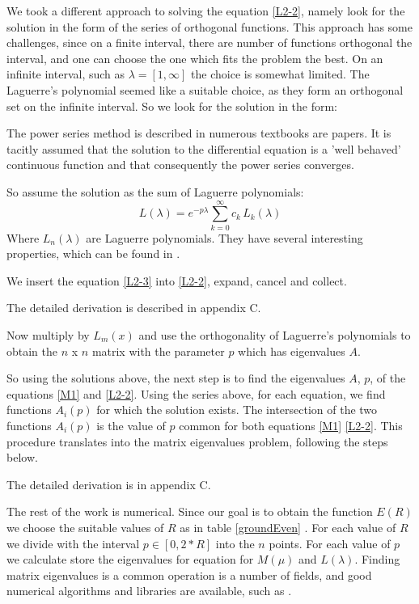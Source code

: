 We took a different approach to solving the equation \eqref{L2-2}, namely look for the solution in the form of the series of orthogonal functions. This approach has some challenges, since on a finite interval, there are number of functions orthogonal the interval, and one can choose the one which fits the problem the best. On an infinite interval, such as $ \lambda = [1, \infty] $ the choice is somewhat limited. The Laguerre's polynomial seemed like a suitable choice, as they form an orthogonal set on the infinite interval. So we look for the solution in the form:

The power series method is described in numerous textbooks are papers. It is tacitly assumed that the solution to the differential equation is a 'well behaved' continuous function and that consequently the power series converges.

So assume the solution as the sum of Laguerre polynomials:
\begin{equation}
L(\lambda) =  e^{-p\lambda}\sum_{k=0}^{\infty}{c_k\,L_k(\lambda)}\label{L2-3}
\end{equation}
Where $ L_n(\lambda) $ are Laguerre polynomials. They have several interesting properties, which can be found in \cite{Laguerre1}.

We insert the equation \ref{L2-3} into \ref{L2-2}, expand, cancel and collect.

The detailed derivation is described in appendix C.

Now multiply by $ L_m(x) $ and use the orthogonality of Laguerre's polynomials to obtain the $ n $ x $ n $ matrix with the parameter $ p $ which has eigenvalues $ A $.

So using the solutions above, the next step is to find the eigenvalues $ A $, $ p $, of the equations \eqref{M1} and \eqref{L2-2}. Using the series above, for each equation, we find functions $ A_i(p) $ for which the solution exists. The intersection of the two functions $ A_i(p) $ is the value of $ p $ common for both equations \eqref{M1} \eqref{L2-2}. This procedure translates into the matrix eigenvalues problem, following the steps below.

The detailed derivation is in appendix C.

The rest of the work is numerical. Since our goal is to obtain the function $ E(R) $ we choose the suitable values of $ R $ as in table \ref{groundEven} . For each value of $ R $ we divide with the interval $ p \in [0,2*R] $ into the $ n $ points. For each value of $ p $ we calculate store the eigenvalues for equation for $ M(\mu) $ and $ L(\lambda) $. Finding matrix eigenvalues is a common operation is a number of fields, and good numerical algorithms and libraries are available, such as \cite{Lapack1}. 


